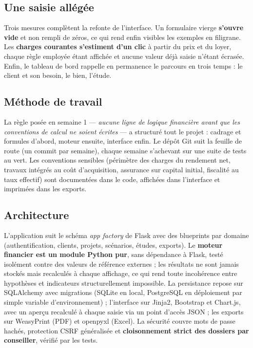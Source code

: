 \documentclass[11pt,a4paper]{article}
\begin{document}
\subsection{Une saisie allégée}
Trois mesures complètent la refonte de l'interface. Un formulaire vierge \textbf{s'ouvre vide} et non rempli de zéros, ce qui rend enfin visibles les exemples en filigrane. Les \textbf{charges courantes s'estiment d'un clic} à partir du prix et du loyer, chaque règle employée étant affichée et aucune valeur déjà saisie n'étant écrasée. Enfin, le tableau de bord rappelle en permanence le parcours en trois temps : le client et son besoin, le bien, l'étude.


\subsection{Méthode de travail}
La règle posée en semaine 1 — \textit{aucune ligne de logique financière avant que les conventions de calcul ne soient écrites} — a structuré tout le projet : cadrage et formules d'abord, moteur ensuite, interface enfin. Le dépôt Git suit la feuille de route (un commit par semaine), chaque semaine s'achevant sur une suite de tests au vert. Les conventions sensibles (périmètre des charges du rendement net, travaux intégrés au coût d'acquisition, assurance sur capital initial, fiscalité au taux effectif) sont documentées dans le code, affichées dans l'interface et imprimées dans les exports.

\subsection{Architecture}
L'application suit le schéma \textit{app factory} de Flask avec des blueprints par domaine (authentification, clients, projets, scénarios, études, exports). Le \textbf{moteur financier est un module Python pur}, sans dépendance à Flask, testé isolément contre des valeurs de référence externes ; les résultats ne sont jamais stockés mais recalculés à chaque affichage, ce qui rend toute incohérence entre hypothèses et indicateurs structurellement impossible. La persistance repose sur SQLAlchemy avec migrations (SQLite en local, PostgreSQL en déploiement par simple variable d'environnement) ; l'interface sur Jinja2, Bootstrap et Chart.js, avec un aperçu recalculé à chaque saisie via un point d'accès JSON ; les exports sur WeasyPrint (PDF) et openpyxl (Excel). La sécurité couvre mots de passe hachés, protection CSRF généralisée et \textbf{cloisonnement strict des dossiers par conseiller}, vérifié par les tests.
\end{document}
